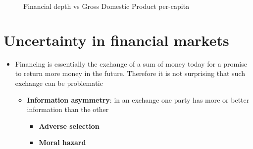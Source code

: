 \documentclass[
  ignorenonframetext,
]{beamer}
\providecommand{\tightlist}{%
  \setlength{\itemsep}{0pt}\setlength{\parskip}{0pt}}\usepackage{longtable,booktabs,array}
\begin{document}
\begin{frame}{}
\label{section-7}
\begin{figure}


\caption{\label{fig-market-capitalization-gdp-pc-col}Financial depth vs
Gross Domestic Product per-capita}

\end{figure}%
\end{frame}

\section{Uncertainty in financial
markets}\label{uncertainty-in-financial-markets}

\begin{frame}{}
\label{section-8}
\begin{itemize}
\item
  Financing is essentially the exchange of a sum of money today for a
  promise to return more money in the future. Therefore it is not
  surprising that such exchange can be problematic

  \begin{itemize}
  \item
    \textbf{Information asymmetry}: in an exchange one party has more or
    better information than the other

    \begin{itemize}
    \tightlist
    \item
      \textbf{Adverse selection}
    \item
      \textbf{Moral hazard}
    \end{itemize}
  \end{itemize}
\end{itemize}
\end{frame}
\end{document}

